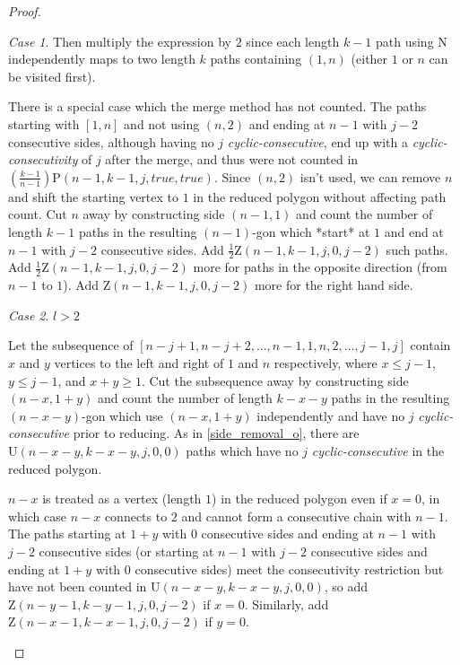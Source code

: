 \documentclass[a4paper, 12pt] {article}
\theoremstyle{remark}
\theoremstyle{plain}
\theoremstyle{remark}
\newtheorem{case}{Case}
\begin{document}
\begin{proof}
\begin{case}
Then multiply the expression by $2$ since each length $k-1$ path using $\mathrm{N}$ independently maps to two length $k$ paths containing $(1,n)$ (either $1$ or $n$ can be visited first).

There is a special case which the merge method has not counted. The paths starting with $[1,n]$ and not using $(n,2)$ and ending at $n-1$ with $j-2$ consecutive sides, although having no $j$ \textit{cyclic-consecutive}, end up with a \textit{cyclic-consecutivity} of $j$ after the merge, and thus were not counted in $\left(\frac{k-1}{n-1}\right)\mathrm{P}(n-1,k-1,j,true,true)$. Since $(n,2)$ isn't used, we can remove $n$ and shift the starting vertex to $1$ in the reduced polygon without affecting path count. Cut $n$ away by constructing side $(n-1,1)$ and count the number of length $k-1$ paths in the resulting $(n-1)$-gon which *start* at $1$ and end at $n-1$ with $j-2$ consecutive sides. Add $\frac{1}{2}\mathrm{Z}(n-1,k-1,j,0,j-2)$ such paths. Add $\frac{1}{2}\mathrm{Z}(n-1,k-1,j,0,j-2)$ more for paths in the opposite direction (from $n-1$ to $1$). Add $\mathrm{Z}(n-1,k-1,j,0,j-2)$ more for the right hand side.
\end{case}

\begin{case} $l>2$
\label{vertex_merge_u_lg2}

Let the subsequence of $[n-j+1,n-j+2,...,n-1,1,n,2,...,j-1,j]$ contain $x$ and $y$ vertices to the left and right of $1$ and $n$ respectively, where $x \leq j-1$, $y \leq j-1$, and $x+y \geq 1$. Cut the subsequence away by constructing side $(n-x,1+y)$ and count the number of length $k-x-y$ paths in the resulting $(n-x-y)$-gon which use $(n-x,1+y)$ independently and have no $j$ \textit{cyclic-consecutive} prior to reducing. As in \ref{side_removal_o}, there are $\mathrm{U}(n-x-y,k-x-y,j,0,0)$ paths which have no $j$ \textit{cyclic-consecutive} in the reduced polygon.

$n-x$ is treated as a vertex (length $1$) in the reduced polygon even if $x=0$, in which case $n-x$ connects to $2$ and cannot form a consecutive chain with $n-1$. The paths starting at $1+y$ with $0$ consecutive sides and ending at $n-1$ with $j-2$ consecutive sides (or starting at $n-1$ with $j-2$ consecutive sides and ending at $1+y$ with $0$ consecutive sides) meet the consecutivity restriction but have not been counted in $\mathrm{U}(n-x-y,k-x-y,j,0,0)$, so add $\mathrm{Z}(n-y-1,k-y-1,j,0,j-2)$ if $x=0$. Similarly, add $\mathrm{Z}(n-x-1,k-x-1,j,0,j-2)$ if $y=0$.


\end{case}
\end{proof}
\end{document}
